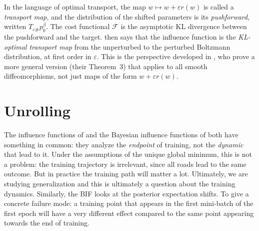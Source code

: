 \documentclass[11pt]{article}
\begin{document}
\begin{remark}\label{rem:optimal-transport}
In the language of optimal transport, the map $w\mapsto w+\varepsilon r(w)$ is called a \emph{transport map}, and the distribution of the shifted parameters is its \emph{pushforward}, written $T_{\varepsilon\#}p_0^\beta$. The cost functional $\mathcal{F}$ is the asymptotic KL divergence between the pushforward and the target.  then says that the influence function is the \emph{KL-optimal transport map} from the unperturbed to the perturbed Boltzmann distribution, at first order in $\varepsilon$. This is the perspective developed in \citet{mlodozeniec2025distributional}, who prove a more general version (their Theorem~3) that applies to all smooth diffeomorphisms, not just maps of the form $w+\varepsilon r(w)$.
\end{remark}


\section{Unrolling}\label{sec:unrolling}

The influence functions of  and the Bayesian influence functions of  both have something in common: they analyze the \emph{endpoint} of training, not the \emph{dynamic} that lead to it. Under the assumptions of the unique global minimum, this is not a problem: the training trajectory is irrelevant, since all roads lead to the same outcome. But in practice the training path will matter a lot. Ultimately, we are studying generalization and this is ultimately a question about the training dynamics. Similarly, the BIF looks at the posterior expectation shifts. To give a concrete failure mode: a training point that appears in the first mini-batch of the first epoch will have a very different effect compared to the same point appearing towards the end of training.
\end{document}
